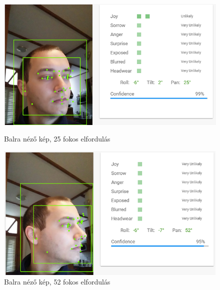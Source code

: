 \begin{figure}[h]
 \begin{minipage}{.5\textwidth} 
\centering
    \includegraphics[scale=0.3]{img/cloud_vision_left}
    \caption{Balra néző kép, 25 fokos elfordulás}
 \end{minipage}
 \begin{minipage}{.5\textwidth} 
\centering
     \includegraphics[scale=0.3]{img/cloud_vision_very_left}
     \caption{Balra néző kép, 52 fokos elfordulás}
 \end{minipage}
\end{figure}


